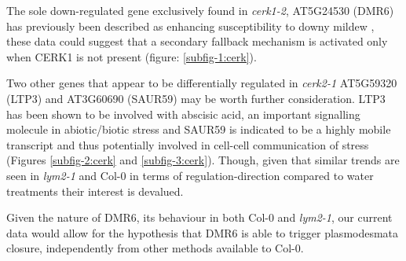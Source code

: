 \documentclass[../main.tex]{subfiles}
\begin{document}
The sole down-regulated gene exclusively found in \textit{cerk1-2}, AT5G24530
(DMR6) has previously been described as enhancing susceptibility to downy mildew
\cite{DOWNYMILDEWRESISTANT}, these data could suggest that a secondary fallback
mechanism is activated only when CERK1 is not present (figure:
\ref{subfig-1:cerk}).

Two other genes that appear to be differentially regulated in \textit{cerk2-1}
AT5G59320 (LTP3) and AT3G60690 (SAUR59) may be worth further consideration. LTP3
has been shown to be involved with abscisic acid, an important signalling
molecule in abiotic/biotic stress \cite{vishwakarmaAbscisicAcidSignaling2017} and
SAUR59 is indicated to be a highly mobile transcript
\cite{thiemeEndogenousArabidopsisMessenger2015} and thus potentially involved in
cell-cell communication of stress (Figures \ref{subfig-2:cerk} and
\ref{subfig-3:cerk}). Though, given that similar trends are seen in
\textit{lym2-1} and Col-0 in terms of regulation-direction compared to water
treatments their interest is devalued.

Given the nature of DMR6, its behaviour in both Col-0 and \textit{lym2-1}, our
current data would allow for the hypothesis that DMR6 is able to trigger
plasmodesmata closure, independently from other methods available to Col-0.

\end{document}
